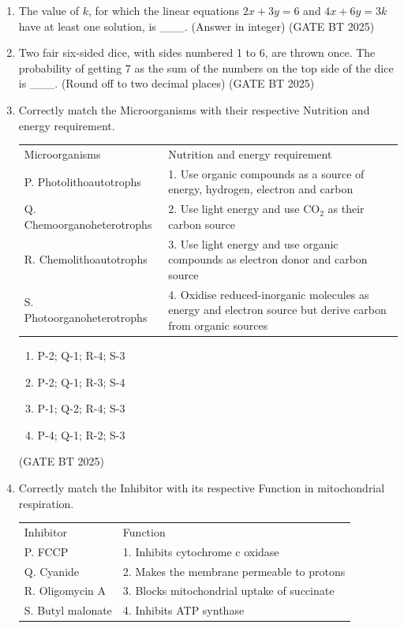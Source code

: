 \documentclass[journal,12pt,onecolumn]{IEEEtran}
\theoremstyle{remark}
\begin{document}
\begin{enumerate}
\item The value of $k$, for which the linear equations $2x + 3y = 6$ and $4x + 6y = 3k$ have at least one solution, is \_\_\_.  
(Answer in integer)  
\hfill (GATE BT 2025)

\item Two fair six-sided dice, with sides numbered 1 to 6, are thrown once. The probability of getting 7 as the sum of the numbers on the top side of the dice is \_\_\_.  
(Round off to two decimal places)  
\hfill (GATE BT 2025)

\item Correctly match the Microorganisms with their respective Nutrition and energy requirement.  

\begin{tabular}{ll}
Microorganisms & Nutrition and energy requirement \\
P. Photolithoautotrophs & 1. Use organic compounds as a source of energy, hydrogen, electron and carbon \\
Q. Chemoorganoheterotrophs & 2. Use light energy and use CO$_2$ as their carbon source \\
R. Chemolithoautotrophs & 3. Use light energy and use organic compounds as electron donor and carbon source \\
S. Photoorganoheterotrophs & 4. Oxidise reduced-inorganic molecules as energy and electron source but derive carbon from organic sources
\end{tabular}  

\begin{enumerate}
    \item P-2; Q-1; R-4; S-3
    \item P-2; Q-1; R-3; S-4
    \item P-1; Q-2; R-4; S-3
    \item P-4; Q-1; R-2; S-3
\end{enumerate}  
\hfill (GATE BT 2025)

\item Correctly match the Inhibitor with its respective Function in mitochondrial respiration.  

\begin{tabular}{ll}
Inhibitor & Function \\
P. FCCP & 1. Inhibits cytochrome c oxidase \\
Q. Cyanide & 2. Makes the membrane permeable to protons \\
R. Oligomycin A & 3. Blocks mitochondrial uptake of succinate \\
S. Butyl malonate & 4. Inhibits ATP synthase
\end{tabular}  


\end{enumerate}
\end{document}
